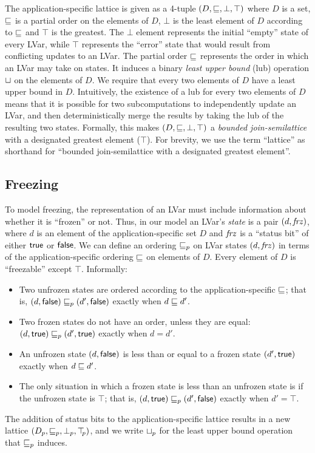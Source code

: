 \documentclass{article}
\begin{document}
The application-specific lattice is given as a 4-tuple $(D, \sqsubseteq,
\bot, \top)$ where $D$ is a set, $\sqsubseteq$ is a partial order on the
elements of $D$, $\bot$ is the least element of $D$ according to
$\sqsubseteq$ and $\top$ is the greatest.  The $\bot$ element represents
the initial ``empty'' state of every LVar, while $\top$ represents the
``error'' state that would result from conflicting updates to an LVar.
The partial order $\sqsubseteq$ represents the order in which an LVar may
take on states.  It induces a binary \emph{least upper bound} (lub)
operation $ \sqcup $ on the elements of $D$.  We require that
every two elements of $D$ have a least upper bound in $D$.
Intuitively, the existence of a lub for every two elements of $D$
means that it is possible for two subcomputations to independently
update an LVar, and then deterministically merge the results by taking
the lub of the resulting two states.  Formally, this makes $(D,
\sqsubseteq, \bot, \top)$ a \emph{bounded join-semilattice} with a
designated greatest element ($\top$).  For brevity, we use the term
``lattice'' as shorthand for ``bounded join-semilattice with a
designated greatest element''.

\subsection{Freezing}
 
To model freezing, the representation of an LVar must include
information about whether it is ``frozen'' or not.  Thus, in our model
an LVar's \emph{state} is a pair $(d, \mathit{frz})$, where $d$ is an
element of the application-specific set $D$ and $\mathit{frz}$ is a
``status bit'' of either $\textsf{true}$ or $\textsf{false}$.  We can
define an ordering $\sqsubseteq_p$ on LVar states $(d, \mathit{frz})$ in
terms of the application-specific ordering $\sqsubseteq$ on elements of
$D$.  Every element of $D$ is ``freezable'' except $\top$.
Informally:
\begin{itemize}
\item Two unfrozen states are ordered according to the
  application-specific $\sqsubseteq$; that is, $(d, \textsf{false})
  \sqsubseteq_p (d', \textsf{false})$ exactly when $d \sqsubseteq d'$.
\item Two frozen states do not have an order, unless they are equal:
  $(d, \textsf{true}) \sqsubseteq_p (d', \textsf{true})$ exactly when
  $d = d'$.
\item An unfrozen state $(d, \textsf{false})$ is less than or
  equal to a frozen state $(d', \textsf{true})$ exactly when $d
  \sqsubseteq d'$.
\item The only situation in which a frozen state is less than an
  unfrozen state is if the unfrozen state is $\top$; that is,
  $(d, \textsf{true}) \sqsubseteq_p (d', \textsf{false})$ exactly when
  $d' = \top$.
\end{itemize}
The addition of status bits to the application-specific lattice
results in a new lattice $(D_p, \sqsubseteq_p, \bot_{p}, \top\hspace{-0.85mm}_{p})$, and we write
$ \sqcup_p $ for the least upper bound operation that $\sqsubseteq_p$ induces.
\end{document}
